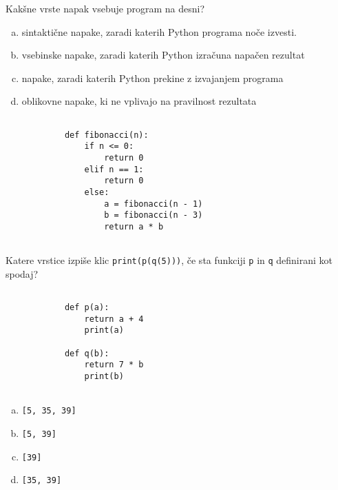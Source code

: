 \documentclass[arhiv, 10pt]{../izpit}
\newcommand{\inlinepy}[1]{\texttt{#1}}
\begin{document}
        \naloga*
        \begin{multicols}{2}
        \noindent
        Kakšne vrste napak vsebuje program na desni?

        \begin{enumerate}[(a)]
\item sintaktične napake, zaradi katerih Python programa noče izvesti.
\item vsebinske napake, zaradi katerih Python izračuna napačen rezultat
\item napake, zaradi katerih Python prekine z izvajanjem programa
\item oblikovne napake, ki ne vplivajo na pravilnost rezultata
\end{enumerate}

        \columnbreak

        \begin{verbatim}
        
            def fibonacci(n):
                if n <= 0:
                    return 0
                elif n == 1:
                    return 0
                else:
                    a = fibonacci(n - 1)
                    b = fibonacci(n - 3)
                    return a * b
            
        \end{verbatim}

        \end{multicols}

    
        \naloga*
        Katere vrstice izpiše klic \inlinepy{print(p(q(5)))}, če sta funkciji \inlinepy{p} in \inlinepy{q} definirani kot spodaj?

        \begin{multicols}{2}
        \begin{verbatim}
        
            def p(a):
                return a + 4
                print(a)

            def q(b):
                return 7 * b
                print(b)
        
        \end{verbatim}

        \begin{enumerate}[(a)]
\item \inlinepy{[5, 35, 39]}
\item \inlinepy{[5, 39]}
\item \inlinepy{[39]}
\item \inlinepy{[35, 39]}
\end{enumerate}

        \end{multicols}
    
\end{document}
